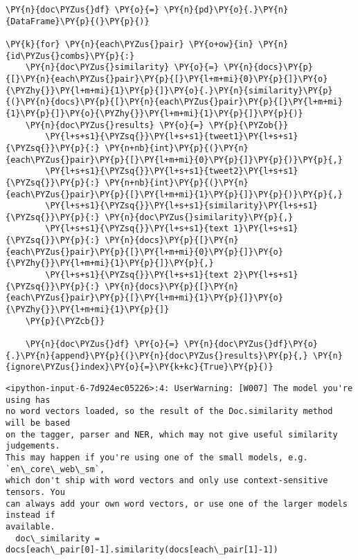     \begin{tcolorbox}[breakable, size=fbox, boxrule=1pt, pad at break*=1mm,colback=cellbackground, colframe=cellborder]
\begin{Verbatim}[commandchars=\\\{\}]
\PY{n}{doc\PYZus{}df} \PY{o}{=} \PY{n}{pd}\PY{o}{.}\PY{n}{DataFrame}\PY{p}{(}\PY{p}{)}

\PY{k}{for} \PY{n}{each\PYZus{}pair} \PY{o+ow}{in} \PY{n}{id\PYZus{}combs}\PY{p}{:}
    \PY{n}{doc\PYZus{}similarity} \PY{o}{=} \PY{n}{docs}\PY{p}{[}\PY{n}{each\PYZus{}pair}\PY{p}{[}\PY{l+m+mi}{0}\PY{p}{]}\PY{o}{\PYZhy{}}\PY{l+m+mi}{1}\PY{p}{]}\PY{o}{.}\PY{n}{similarity}\PY{p}{(}\PY{n}{docs}\PY{p}{[}\PY{n}{each\PYZus{}pair}\PY{p}{[}\PY{l+m+mi}{1}\PY{p}{]}\PY{o}{\PYZhy{}}\PY{l+m+mi}{1}\PY{p}{]}\PY{p}{)}
    \PY{n}{doc\PYZus{}results} \PY{o}{=} \PY{p}{\PYZob{}}
        \PY{l+s+s1}{\PYZsq{}}\PY{l+s+s1}{tweet1}\PY{l+s+s1}{\PYZsq{}}\PY{p}{:} \PY{n+nb}{int}\PY{p}{(}\PY{n}{each\PYZus{}pair}\PY{p}{[}\PY{l+m+mi}{0}\PY{p}{]}\PY{p}{)}\PY{p}{,}
        \PY{l+s+s1}{\PYZsq{}}\PY{l+s+s1}{tweet2}\PY{l+s+s1}{\PYZsq{}}\PY{p}{:} \PY{n+nb}{int}\PY{p}{(}\PY{n}{each\PYZus{}pair}\PY{p}{[}\PY{l+m+mi}{1}\PY{p}{]}\PY{p}{)}\PY{p}{,}
        \PY{l+s+s1}{\PYZsq{}}\PY{l+s+s1}{similarity}\PY{l+s+s1}{\PYZsq{}}\PY{p}{:} \PY{n}{doc\PYZus{}similarity}\PY{p}{,}
        \PY{l+s+s1}{\PYZsq{}}\PY{l+s+s1}{text 1}\PY{l+s+s1}{\PYZsq{}}\PY{p}{:} \PY{n}{docs}\PY{p}{[}\PY{n}{each\PYZus{}pair}\PY{p}{[}\PY{l+m+mi}{0}\PY{p}{]}\PY{o}{\PYZhy{}}\PY{l+m+mi}{1}\PY{p}{]}\PY{p}{,}
        \PY{l+s+s1}{\PYZsq{}}\PY{l+s+s1}{text 2}\PY{l+s+s1}{\PYZsq{}}\PY{p}{:} \PY{n}{docs}\PY{p}{[}\PY{n}{each\PYZus{}pair}\PY{p}{[}\PY{l+m+mi}{1}\PY{p}{]}\PY{o}{\PYZhy{}}\PY{l+m+mi}{1}\PY{p}{]}
    \PY{p}{\PYZcb{}}
    
    \PY{n}{doc\PYZus{}df} \PY{o}{=} \PY{n}{doc\PYZus{}df}\PY{o}{.}\PY{n}{append}\PY{p}{(}\PY{n}{doc\PYZus{}results}\PY{p}{,} \PY{n}{ignore\PYZus{}index}\PY{o}{=}\PY{k+kc}{True}\PY{p}{)}
\end{Verbatim}
\end{tcolorbox}

    \begin{Verbatim}[commandchars=\\\{\}]
<ipython-input-6-7d924ec05226>:4: UserWarning: [W007] The model you're using has
no word vectors loaded, so the result of the Doc.similarity method will be based
on the tagger, parser and NER, which may not give useful similarity judgements.
This may happen if you're using one of the small models, e.g. `en\_core\_web\_sm`,
which don't ship with word vectors and only use context-sensitive tensors. You
can always add your own word vectors, or use one of the larger models instead if
available.
  doc\_similarity = docs[each\_pair[0]-1].similarity(docs[each\_pair[1]-1])
    \end{Verbatim}

